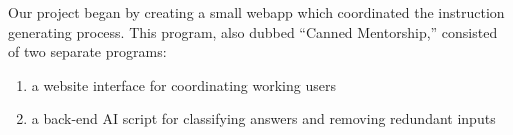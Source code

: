 Our project began by creating a small webapp which coordinated the instruction generating process.
This program, also dubbed ``Canned Mentorship,'' consisted of two separate programs:
\begin{enumerate}
	\item a website interface for coordinating working users
	\item a back-end AI script for classifying answers and removing redundant inputs
\end{enumerate}




%


